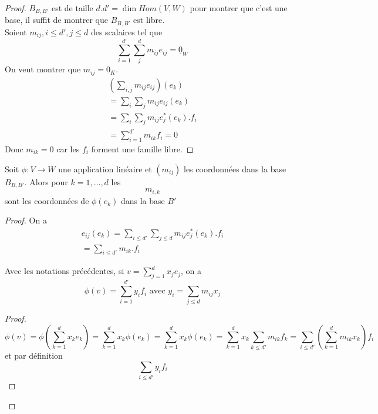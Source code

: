 \documentclass[../main.tex]{subfiles}
\begin{document}
\begin{proof}
	$B_{B,B'} $ est de taille $d.d' = \dim Hom( V,W)  $ pour montrer que c'est une base, il suffit de montrer que $B_{B,B'}$ est libre.\\
	Soient $m_{ij} , i\leq d', j \leq d $ des scalaires tel que
	\[ 
		\sum_{i=1}^{d'} \sum_{j}^{ d}m_{ij} e_{ij} = \underline{0}_W
	\]
	On veut montrer que $m_{ij} = 0_K$.\\
	\begin{align*}
	\left( \sum_{i,j} m_{ij} e_{ij}  \right) ( e_k) \\
	= \sum_i \sum_j m_{ij} e_{ij} ( e_k) \\
	= \sum_i \sum_j m_{ij} e_{j} ^{*}( e_k) . f_i	\\
	= \sum_{i=1}^{ d'}m_{ik} f_{i} = 0 
	\end{align*}
	Donc $m_{ik} =0	$  car les $f_i$ forment une famille libre.
	
\end{proof}
\begin{propo}
	Soit $\phi: V \to W$ une application linéaire et $ ( m_{ij} ) $ les coordonnées dans la base $B_{B,B'}$. Alors pour $k= 1,\ldots, d$ les
	\[ 
	m_{i,k} 
	\]
	sont les coordonnées de $\phi( e_k) $ dans la base $B'$
\end{propo}
\begin{proof}
On a 
\begin{align*}
e_{ij} ( e_k) = \sum_{i\leq d'} \sum_{j\leq d} m_{ij} e_{j} ^{*}( e_k) .f_i\\
= \sum_{i\leq d'} m_{ik} .f_i 
\end{align*}
\begin{propo}
Avec les notations précédentes, si $v= \sum_{j=1} ^{d}x_j e_j$, on a
\[ 
	\phi( v) = \sum_{i=1}^{ d'}y_i f_i \text{ avec } y_i = \sum_{j\leq d}m_{ij} x_j
\]

\end{propo}
\begin{proof}
\[ 
	\phi( v) = \phi( \sum_{k=1}^{ d}x_{k} e_k ) = \sum_{k=1}^{ d}x_k \phi( e_k) = \sum_{k=1}^{ d}x_k \phi( e_k) = \sum_{k=1} ^{d}x_k \sum_{k\leq d'} m_{ik} f_k = \sum_{i\leq d'} \left( \sum_{k=1}^{ d} m_{ik} x_k \right) f_i
\]
et par définition
\[ 
\sum_{i\leq d'} y_i f_i
\]


\end{proof}




\end{proof}


	
 
		
	
\end{document}
